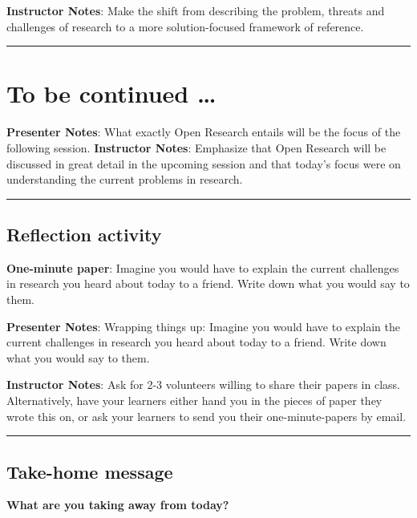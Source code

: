 \documentclass[
  english,
  letterpaper,
  DIV=11,
  numbers=noendperiod]{scrartcl}
\begin{document}
\textbf{Instructor Notes}: Make the shift from describing the problem,
threats and challenges of research to a more solution-focused framework
of reference.

\begin{center}\rule{0.5\linewidth}{0.5pt}\end{center}

\section{To be continued \ldots{}}\label{to-be-continued}

\textbf{Presenter Notes}: What exactly Open Research entails will be the
focus of the following session. \textbf{Instructor Notes}: Emphasize
that Open Research will be discussed in great detail in the upcoming
session and that today's focus were on understanding the current
problems in research.

\begin{center}\rule{0.5\linewidth}{0.5pt}\end{center}

\subsection{Reflection activity}\label{reflection-activity}

\textbf{One-minute paper}: Imagine you would have to explain the current
challenges in research you heard about today to a friend. Write down
what you would say to them.

\textbf{Presenter Notes}: Wrapping things up: Imagine you would have to
explain the current challenges in research you heard about today to a
friend. Write down what you would say to them.

\textbf{Instructor Notes}: Ask for 2-3 volunteers willing to share their
papers in class. Alternatively, have your learners either hand you in
the pieces of paper they wrote this on, or ask your learners to send you
their one-minute-papers by email.

\begin{center}\rule{0.5\linewidth}{0.5pt}\end{center}

\subsection{Take-home message}\label{take-home-message}

\textbf{What are you taking away from today?}
\end{document}
